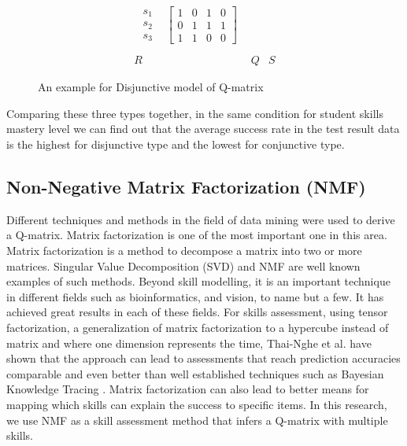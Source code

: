\begin{figure}[h]
\begin{footnotesize}
\[\begin{array}{ccc}
\begin{array}{cc}
\begin{array}{c}
s_{1}\\
s_{2}\\
s_{3}
\end{array} & \left[\begin{array}{cccc}
1 & 0 & 1 & 0\\
0 & 1 & 1 & 1\\
1 & 1 & 0 & 0
\end{array}\right]
\end{array}\\
\\
R & Q & S
\end{array}
\]
 \end{footnotesize} \caption{An example for Disjunctive model of Q-matrix}


\label{fig1Dis} 
\end{figure}

Comparing these three types together, in the same condition for student skills mastery level we can find out that the average success rate in the test result data is the highest for disjunctive type and the lowest for conjunctive type. 


\subsection{Non-Negative Matrix Factorization (\ac{NMF})}
\label{NMF_MODEL_ASSESS}

Different techniques and methods in the field of data mining were used to derive a Q-matrix. Matrix factorization is one of the most important one in this area. Matrix factorization is a method to decompose a matrix into two or more matrices. Singular Value Decomposition (SVD) and NMF are well known examples of such methods. Beyond skill modelling, it is an important technique in different fields such as bioinformatics, and vision, to name but a few. It has achieved great results in each of these fields. For skills assessment, using tensor factorization, a generalization of matrix factorization to a hypercube instead of matrix and where one dimension represents the time, Thai-Nghe et al. \citep{Nguyen2011} have shown that the approach can lead to assessments that reach prediction accuracies comparable and even better than well established techniques such as Bayesian Knowledge Tracing \citep{corbett:umuai:1995}. Matrix factorization can also lead to better means for mapping which skills can explain the success to specific items. In this research, we use NMF as a skill assessment method that infers a Q-matrix with multiple skills.

